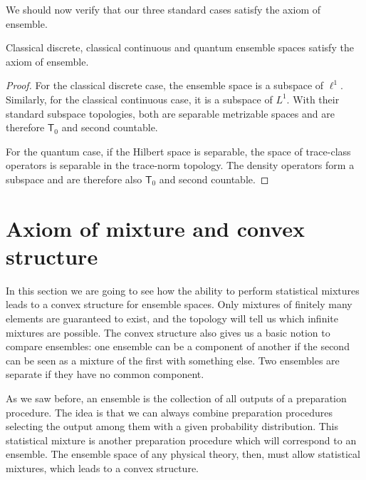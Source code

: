 We should now verify that our three standard cases satisfy the axiom of ensemble.

\begin{mathSection}
\begin{prop}
	Classical discrete, classical continuous and quantum ensemble spaces satisfy the axiom of ensemble.
\end{prop}

\begin{proof}
	For the classical discrete case, the ensemble space is a subspace of $\ell^1$. Similarly, for the classical continuous case, it is a subspace of $L^1$. With their standard subspace topologies, both are separable metrizable spaces and are therefore $\mathsf{T}_0$ and second countable.
	
	For the quantum case, if the Hilbert space is separable, the space of trace-class operators is separable in the trace-norm topology. The density operators form a subspace and are therefore also $\mathsf{T}_0$ and second countable.
\end{proof}
\end{mathSection}

\section{Axiom of mixture and convex structure}

In this section we are going to see how the ability to perform statistical mixtures leads to a convex structure for ensemble spaces. Only mixtures of finitely many elements are guaranteed to exist, and the topology will tell us which infinite mixtures are possible. The convex structure also gives us a basic notion to compare ensembles: one ensemble can be a component of another if the second can be seen as a mixture of the first with something else. Two ensembles are separate if they have no common component.

As we saw before, an ensemble is the collection of all outputs of a preparation procedure. The idea is that we can always combine preparation procedures selecting the output among them with a given probability distribution. This statistical mixture is another preparation procedure which will correspond to an ensemble. The ensemble space of any physical theory, then, must allow statistical mixtures, which leads to a convex structure.

